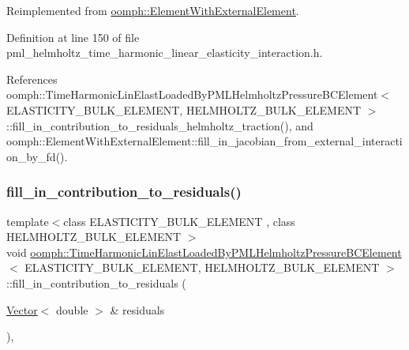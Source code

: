 Reimplemented from \hyperlink{classoomph_1_1ElementWithExternalElement_ae5fb09552a8271e891438f8d058ca1b8}{oomph\+::\+Element\+With\+External\+Element}.



Definition at line 150 of file pml\+\_\+helmholtz\+\_\+time\+\_\+harmonic\+\_\+linear\+\_\+elasticity\+\_\+interaction.\+h.



References oomph\+::\+Time\+Harmonic\+Lin\+Elast\+Loaded\+By\+P\+M\+L\+Helmholtz\+Pressure\+B\+C\+Element$<$ E\+L\+A\+S\+T\+I\+C\+I\+T\+Y\+\_\+\+B\+U\+L\+K\+\_\+\+E\+L\+E\+M\+E\+N\+T, H\+E\+L\+M\+H\+O\+L\+T\+Z\+\_\+\+B\+U\+L\+K\+\_\+\+E\+L\+E\+M\+E\+N\+T $>$\+::fill\+\_\+in\+\_\+contribution\+\_\+to\+\_\+residuals\+\_\+helmholtz\+\_\+traction(), and oomph\+::\+Element\+With\+External\+Element\+::fill\+\_\+in\+\_\+jacobian\+\_\+from\+\_\+external\+\_\+interaction\+\_\+by\+\_\+fd().

\mbox{\label{classoomph_1_1TimeHarmonicLinElastLoadedByPMLHelmholtzPressureBCElement_a44261df2f1e5122ad707f17523a439c2}} 
\subsubsection{\texorpdfstring{fill\+\_\+in\+\_\+contribution\+\_\+to\+\_\+residuals()}{fill\_in\_contribution\_to\_residuals()}}
{\footnotesize\ttfamily template$<$class E\+L\+A\+S\+T\+I\+C\+I\+T\+Y\+\_\+\+B\+U\+L\+K\+\_\+\+E\+L\+E\+M\+E\+NT , class H\+E\+L\+M\+H\+O\+L\+T\+Z\+\_\+\+B\+U\+L\+K\+\_\+\+E\+L\+E\+M\+E\+NT $>$ \\
void \hyperlink{classoomph_1_1TimeHarmonicLinElastLoadedByPMLHelmholtzPressureBCElement}{oomph\+::\+Time\+Harmonic\+Lin\+Elast\+Loaded\+By\+P\+M\+L\+Helmholtz\+Pressure\+B\+C\+Element}$<$ E\+L\+A\+S\+T\+I\+C\+I\+T\+Y\+\_\+\+B\+U\+L\+K\+\_\+\+E\+L\+E\+M\+E\+NT, H\+E\+L\+M\+H\+O\+L\+T\+Z\+\_\+\+B\+U\+L\+K\+\_\+\+E\+L\+E\+M\+E\+NT $>$\+::fill\+\_\+in\+\_\+contribution\+\_\+to\+\_\+residuals (\begin{DoxyParamCaption}\item[{\hyperlink{classoomph_1_1Vector}{Vector}$<$ double $>$ \&}]{residuals }\end{DoxyParamCaption})\hspace{0.3cm}{\ttfamily [inline]}, {\ttfamily [virtual]}}



